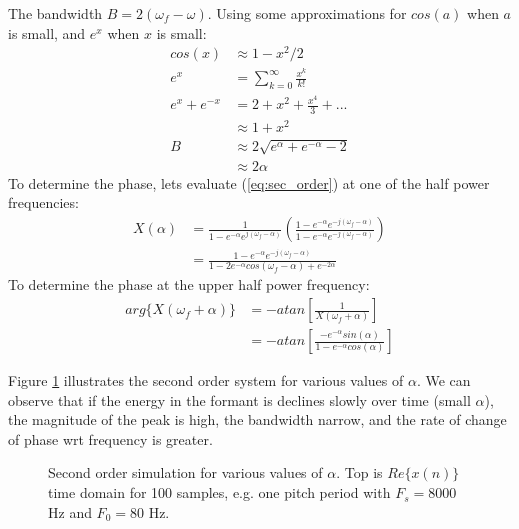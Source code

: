 \documentclass{article}
\begin{document}
The bandwidth $B=2(\omega_f - \omega)$.  Using some approximations for $cos(a)$ when $a$ is small, and $e^x$ when $x$ is small:
\begin{equation}
\begin{split}
cos(x) &\approx 1-x^2/2 \\
e^x &= \sum_{k=0}^{\infty}\frac{x^k}{k!} \\
e^x + e^{-x} &= 2 + x^2 + \frac{x^4}{3} + ... \\
             &\approx 1 + x^2     \\
B &\approx 2\sqrt{e^\alpha+e^{-\alpha}-2} \\
  &\approx 2\alpha
\end{split}
\end{equation}
To determine the phase, lets evaluate (\ref{eq:sec_order}) at one of the half power frequencies:
\begin{equation}
\begin{split}
X(\alpha) &= \frac{1}{1 - e^{-\alpha}e^{j (\omega_f - \alpha)}} \left(\frac{1 - e^{-\alpha}e^{-j (\omega_f - \alpha)}}{1 - e^{-\alpha}e^{-j (\omega_f - \alpha)}} \right)\\
         &= \frac{1 - e^{-\alpha}e^{-j (\omega_f - \alpha)}}{1-2e^{-\alpha}cos(\omega_f-\alpha) + e^{-2\alpha}}
\end{split}
\end{equation}
To determine the phase at the upper half power frequency:
\begin{equation}
\begin{split}
arg\{X(\omega_f + \alpha)\} &= -atan\left[\frac{1}{X(\omega_f+\alpha)}\right] \\
                 &= - atan\left[\frac{-e^{-\alpha}sin(\alpha)}{1-e^{-\alpha} cos(\alpha)}\right]
\end{split}
\end{equation}

Figure \ref{fig:sec_order} illustrates the second order system for various values of $\alpha$. We can observe that if the energy in the formant is declines slowly over time (small $\alpha$), the magnitude of the peak is high, the bandwidth narrow, and the rate of change of phase wrt frequency is greater.
 	
\begin{figure}
\caption{Second order simulation for various values of $\alpha$. Top is $Re\{x(n)\}$ time domain for 100 samples, e.g. one pitch period with $F_s=8000$ Hz and $F_0=80$ Hz.}
\label{fig:sec_order}
\begin{center}

\end{center}
\end{figure}
\end{document}
